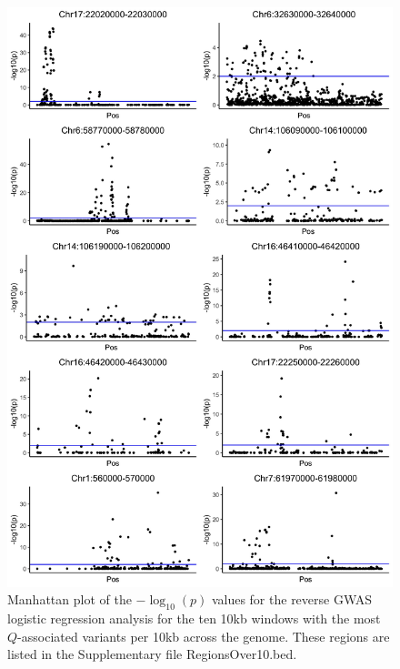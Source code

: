 \documentclass[9pt,lineno]{elife}
\begin{document}
\begin{figure}[h]
\centering
\includegraphics[width=15cm,keepaspectratio]{./Figures/top10.jpg}
\caption{Manhattan plot of the $-\log_{10}(p)$ values for the reverse GWAS logistic regression analysis for the ten 10kb windows with the most  $Q$-associated variants per 10kb across the genome. 
These regions are listed in the Supplementary file RegionsOver10.bed.}  
\label{Top10}
\end{figure}
\end{document}

